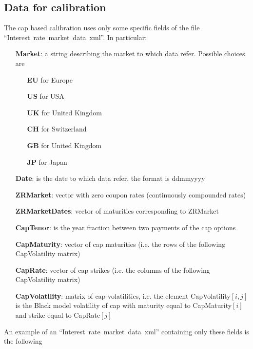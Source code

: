\subsection{Data for calibration}
The cap based calibration uses only some specific fields of the file ``Interest~rate~market~data~xml''. In particular:
\begin{itemize}
\item[\textbf{Market}:] a string describing the market to which data refer. Possible choices are
	\begin{itemize}
	\item[\textbf{EU}] for Europe
    \item[\textbf{US}] for USA
    \item[\textbf{UK}] for United Kingdom
    \item[\textbf{CH}] for Switzerland
    \item[\textbf{GB}] for United Kingdom
    \item[\textbf{JP}] for Japan
	\end{itemize}
\item[\textbf{Date}:] is the date to which data refer, the format is ddmmyyyy
\item[\textbf{ZRMarket}:] vector with zero coupon rates (continuously compounded rates)
\item[\textbf{ZRMarketDates}:] vector of maturities corresponding to ZRMarket
\item[\textbf{CapTenor}:] is the year fraction between two payments of the cap options
\item[\textbf{CapMaturity}:] vector of cap maturities (i.e. the rows of the following CapVolatility matrix)
\item[\textbf{CapRate}:] vector of cap strikes (i.e. the columns of the following CapVolatility matrix)
\item[\textbf{CapVolatility}:] matrix of cap-volatilities, i.e. the element CapVolatility$[ i , j ]$ is the Black model volatility of cap with maturity equal to CapMaturity$[ i ]$ and strike equal to CapRate$[ j ]$
\end{itemize}
An example of an ``Interest~rate~market~data~xml'' containing only these fields is the following
